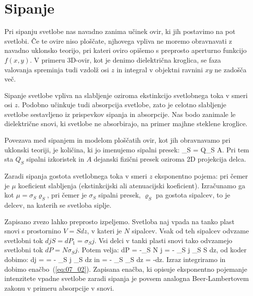 
\chapter{Sipanje}
Pri sipanju svetlobe nas navadno zanima učinek ovir, ki jih postavimo na pot svetlobi. 
Če te ovire niso ploščate, njhovega vpliva ne moremo obravnavati z navadno uklonsko
teorijo, pri kateri oviro opišemo s preprosto aperturno funkcijo $f(x,y)$. V primeru
3D-ovir, kot je denimo dielektrična kroglica, se faza valovanja spreminja tudi vzdolž
osi $z$ in integral v objektni ravnini $xy$ ne zadošča več. 

Sipanje svetlobe vpliva na slabljenje oziroma ekstinkcijo svetlobnega toka v smeri
osi $z$. Podobno učinkuje tudi absorpcija svetlobe, zato je celotno slabljenje
svetlobe sestavljeno iz prispevkov sipanja in absorpcije. Nas bodo zanimale le
dielektrične snovi, ki svetlobe ne absorbirajo, na primer majhne steklene kroglice.

Povezava med sipanjem in modelom ploščatih ovir, kot jih obravnavamo pri uklonski teoriji, 
je količina, ki jo imenujemo sipalni presek:
\beq
\sigma_S = Q_S A.
\label{eq:07_01}
\eeq
Pri tem sta $Q_S$ sipalni izkoristek in $A$ dejanski fizični presek oziroma 2D projekcija delca.

Zaradi sipanja gostota svetlobnega toka v smeri $z$ eksponentno pojema:
pri čemer je $\mu$ koeficient slabljenja (ekstinkcijski ali atenuacijski koeficient). Izračunamo ga
kot $\mu = \sigma_S \varrho_S$, pri čemer je $\sigma_S$ sipalni presek, $\varrho_S$ pa gostota sipalcev,
to je delcev, na katerih se svetloba siplje. 

Zapisano zvezo lahko preprosto izpeljemo. Svetloba naj vpada na tanko plast snovi s prostornino $V = S dz$,
v kateri je $N$ sipalcev. Vsak od teh sipalcev odvzame svetlobni tok $dj S = dP_1 = \sigma_S j$. Vsi delci
v tanki plasti snovi tako odvzamejo svetlobni tok $dP = N \sigma_S j$. Potem velja:
\beq
dP = -\sigma_S N j = - \sigma_S j \varrho_S S dz,
\label{eq:07_03}
\eeq
od koder dobimo:
\beq
dj =  = - \sigma_S j \varrho_S dz
\label{eq:07_04}
\eeq
in 
\beq
{} = - \sigma_S \varrho_S dz = -\mu dz.
\label{eq:07_05}
\eeq
Izraz integriramo in dobimo enačbo~(\ref{eq:07_02}). Zapisana enačba, ki opisuje eksponentno
pojemanje intenzitete vpadne svetlobe zaradi sipanja je povsem analogna Beer-Lambertovem zakonu
v primeru absorpcije v snovi. 

